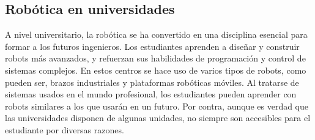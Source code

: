 \newpage
\subsection{Robótica en universidades}
A nivel universitario, la robótica se ha convertido en una disciplina esencial para formar a los futuros ingenieros. Los estudiantes aprenden 
a diseñar y construir robots más avanzados, y refuerzan sus habilidades de programación y control de sistemas complejos. En estos centros 
se hace uso de varios tipos de robots, como pueden ser, brazos industriales y plataformas robóticas móviles. Al tratarse de sistemas 
usados en el mundo profesional, los estudiantes pueden aprender con robots similares a los que usarán en un futuro. Por contra, aunque es verdad 
que las universidades disponen de algunas unidades, no siempre son accesibles para el estudiante por diversas razones.
